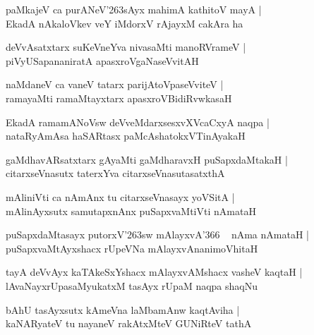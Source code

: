 \documentclass[twoside,12pt,openright]{book}
\def\S{\char'263}
\newcounter{shloka}[chapter]
\begin{document}
\begin{shloka}%
paMkajeV ca purANeV\S sAyx mahimA kathitoV mayA |\\
EkadA nAkaloVkev veY iMdorxV rAjayxM cakAra ha
\end{shloka}

\begin{shloka}%
deVvAsatxtarx suKeVneYva nivasaMti manoRVrameV |\\
piVyUSapananiratA apasxroVgaNaseVvitAH
\end{shloka}

\begin{shloka}%
naMdaneV ca vaneV tatarx parijAtoVpaseVviteV |\\
ramayaMti ramaMtayxtarx apasxroVBidiRvwkasaH
\end{shloka}

\begin{shloka}%
EkadA ramamANoVsw deVveMdarxsesxvXVcaCxyA naqpa |\\
nataRyAmAsa haSARtasx paMcAshatokxVTinAyakaH
\end{shloka}

\begin{shloka}%
gaMdhavARsatxtarx gAyaMti gaMdharavxH puSapxdaMtakaH |\\
citarxseVnasutx taterxYva citarxseVnasutasatxthA
\end{shloka}

\begin{shloka}%
mAliniVti ca nAmAnx tu citarxseVnasayx yoVSitA |\\
mAlinAyxsutx samutapxnAnx puSapxvaMtiVti nAmataH
\end{shloka}

\begin{shloka}%
puSapxdaMtasayx putorxV\S sw mAlayxvA\char'366 ~ nAma nAmataH |\\
puSapxvaMtAyxshacx rUpeVNa mAlayxvAnanimoVhitaH 
\end{shloka}

\begin{shloka}%
tayA deVvAyx kaTAkeSxYshacx mAlayxvAMshacx vasheV kaqtaH |\\
lAvaNayxrUpasaMyukatxM tasAyx rUpaM naqpa shaqNu
\end{shloka}

\begin{shloka}%
bAhU tasAyxsutx kAmeVna laMbamAnw kaqtAviha |\\
kaNARyateV tu nayaneV rakAtxMteV GUNiRteV tathA 
\end{shloka}
\end{document}
